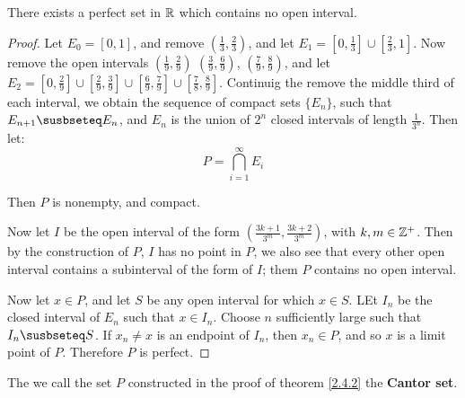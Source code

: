 \begin{theorem}\label{2.4.2}
    There exists a perfect set in $\mathbb{R}$ which contains no open interval.
\end{theorem}
\begin{proof}
    Let $E_0=[0,1]$, and remove  $(\frac{1}{3},\frac{2}{3})$, and let $E_1=[0,\frac{1}{3}] \cup 
    [\frac{2}{3},1]$. Now remove the open intervals $(\frac{1}{9}, \frac{2}{9})$ $(\frac{3}{9}, \frac{6}{9})$, 
    $(\frac{7}{9}, \frac{8}{9})$,  and let $E_2=[0, \frac{2}{9}] \cup [\frac{2}{9}, \frac{3}{9}]
    \cup [\frac{6}{9}, \frac{7}{9}] \cup [\frac{7}{8}, \frac{8}{9}]$. Continuig the remove 
    the middle third of each interval, we obtain the sequence of compact sets $\{E_n\}$, 
    such that  $E_{n+1} \susbseteq E_n$, and $E_n$ is the union of  $2^n$  closed intervals 
    of length $ \frac{1}{3^n}$. Then let:
        \begin{equation}\label{eq_2.1}
            P=\bigcap_{i=1}^{\infty}{E_i}
        \end{equation}

    Then $P$ is nonempty, and compact.

    Now let  $I$ be the open interval of the form  $(\frac{3k+1}{3^m},\frac{3k+2}{3^m})$, 
    with $k,m \in \mathbb{Z}^+$. Then by the construction of  $P$,  $I$ has no point in  $P$, we 
    also see that every other open interval contains a subinterval of the form of  $I$; 
    them  $P$ contains no open interval.

    Now let  $x \in P$, and let  $S$ be any open interval for which  $x \in S$. LEt  $I_n$ be 
    the closed interval of  $E_n$ such that  $x \in I_n$. Choose  $n$ sufficiently large 
    such that $I_n \susbseteq S$. If  $x_n \neq x$ is an endpoint of  $I_n$, then  $x_n \in P$, 
    and so  $x$ is a limit point of  $P$. Therefore  $P$ is perfect.
\end{proof}

\begin{definition}
    The we call the set $P$ constructed in the proof of theorem \ref{2.4.2} the 
    \textbf{Cantor set}.
\end{definition}
